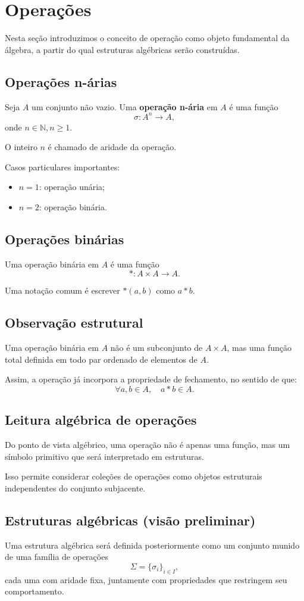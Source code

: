 \documentclass[../../main]{subfiles}
\begin{document}
\section{Operações}
\label{sec:matematica:algebra:estruturas-algebricas:operacoes}

Nesta seção introduzimos o conceito de operação como objeto fundamental da álgebra, a partir do qual estruturas algébricas serão construídas.

\subsection{Operações n-árias}

Seja $A$ um conjunto não vazio. Uma \textbf{operação n-ária} em $A$ é uma função
\[
	\sigma : A^n \to A,
\]
onde $n \in \mathbb{N}, n \geq 1$.

O inteiro $n$ é chamado de aridade da operação.

Casos particulares importantes:
\begin{itemize}
	\item $n=1$: operação unária;
	\item $n=2$: operação binária.
\end{itemize}

\subsection{Operações binárias}

Uma operação binária em $A$ é uma função
\[
	\ast : A \times A \to A.
\]

Uma notação comum é escrever $\ast(a,b)$ como $a \ast b$.

\subsection{Observação estrutural}

Uma operação binária em $A$ não é um subconjunto de $A \times A$, mas uma função total definida em todo par ordenado de elementos de $A$.

Assim, a operação já incorpora a propriedade de fechamento, no sentido de que:
\[
	\forall a,b \in A,\quad a \ast b \in A.
\]

\subsection{Leitura algébrica de operações}

Do ponto de vista algébrico, uma operação não é apenas uma função, mas um símbolo primitivo que será interpretado em estruturas.

Isso permite considerar coleções de operações como objetos estruturais independentes do conjunto subjacente.

\subsection{Estruturas algébricas (visão preliminar)}

Uma estrutura algébrica será definida posteriormente como um conjunto munido de uma família de operações
\[
	\Sigma = \{\sigma_i\}_{i \in I},
\]
cada uma com aridade fixa, juntamente com propriedades que restringem seu comportamento.
\end{document}
